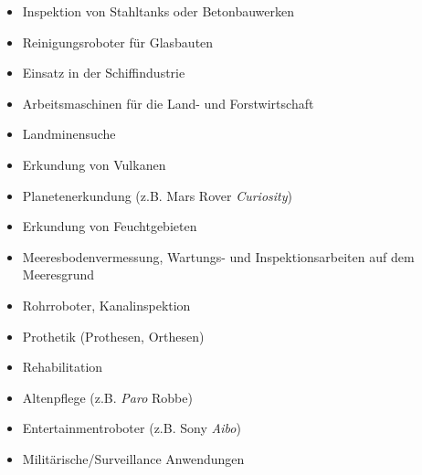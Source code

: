 \begin{itemize}
	\item Inspektion von Stahltanks oder Betonbauwerken
	\item Reinigungsroboter für Glasbauten
	\item Einsatz in der Schiffindustrie
	\item Arbeitsmaschinen für die Land- und Forstwirtschaft
	\item Landminensuche
	\item Erkundung von Vulkanen
	\item Planetenerkundung (z.B. Mars Rover \textit{Curiosity})
	\item Erkundung von Feuchtgebieten
	\item Meeresbodenvermessung, Wartungs- und Inspektionsarbeiten auf dem Meeresgrund
	\item Rohrroboter, Kanalinspektion
	\item Prothetik (Prothesen, Orthesen)
	\item Rehabilitation
	\item Altenpflege (z.B.\textit{ Paro} Robbe)
	\item Entertainmentroboter (z.B. Sony \textit{Aibo})
	\item Militärische/Surveillance Anwendungen
\end{itemize}